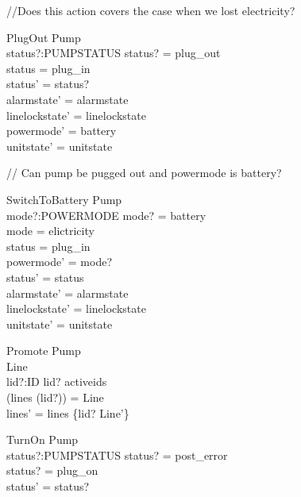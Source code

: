 \documentclass{article}
\begin{document}
	//Does this action covers the case when we lost electricity?
	
	\begin{schema}{PlugOut}
		\Delta Pump\\
		status?:PUMPSTATUS
	\where
		status? = plug\_out \\
		status = plug\_in \\
		status' = status? \\
		alarmstate' = alarmstate \\
		linelockstate' = linelockstate \\
		powermode' =  battery \\
		unitstate' = unitstate \\
	\end{schema}
	
	// Can pump be pugged out and powermode is battery?	
	
	\begin{schema}{SwitchToBattery}
		\Delta Pump\\
		mode?:POWERMODE
	\where 
		mode? = battery \\
		mode = elictricity \\
		status = plug\_in \\
		powermode' = mode? \\
		status' = status \\
		alarmstate' = alarmstate \\
		linelockstate' = linelockstate \\
		unitstate' = unitstate \\
	\end{schema}
	
	\begin{schema}{Promote}
		\Delta Pump\\
		\Delta Line\\
		lid?:ID
	\where 
		lid? \in activeids\\
		(lines (lid?)) = \theta Line\\
		lines' = lines \oplus \{lid? \mapsto \theta Line'\}
	\end{schema}
	
	\begin{schema}{TurnOn}
		\Delta Pump \\
		status?:PUMPSTATUS
	\where 
		status? = post\_error  \\
		status? = plug\_on \\
		status' = status?
	\end{schema}
			
\end{document}
